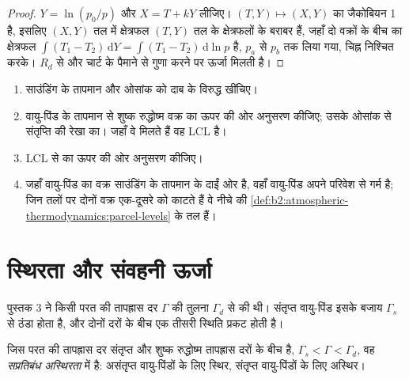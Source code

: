 \begin{proof}
$Y = \ln(p_0/p)$ और $X = T + kY$ लीजिए। $(T, Y) \mapsto (X, Y)$ का जैकोबियन 1 है, इसलिए
$(X, Y)$ तल में क्षेत्रफल $(T, Y)$ तल के क्षेत्रफलों के बराबर हैं, जहाँ दो वक्रों के बीच का क्षेत्रफल
$\int (T_1 - T_2)\,\mathrm{d}Y = \int (T_1 - T_2)\,\mathrm{d}\ln p$ है, $p_a$ से $p_b$ तक लिया गया,
चिह्न निश्चित करके। $R_d$ से और चार्ट के पैमाने से गुणा करने पर ऊर्जा मिलती है।
\end{proof}

\begin{method}[आरेख पर वायु-पिंड को उठाना]\label{met:b2:atmospheric-thermodynamics:lift}
\begin{enumerate}
  \item साउंडिंग के तापमान और ओसांक को दाब के विरुद्ध खींचिए।
  \item वायु-पिंड के तापमान से शुष्क रुद्धोष्म वक्र का ऊपर की ओर अनुसरण कीजिए; उसके ओसांक से
        संतृप्ति  की रेखा का। जहाँ वे मिलते हैं वह LCL है।
  \item LCL से  का ऊपर की ओर अनुसरण कीजिए।
  \item जहाँ वायु-पिंड का वक्र साउंडिंग के तापमान के दाईं ओर है, वहाँ वायु-पिंड
        अपने परिवेश से गर्म है; जिन तलों पर दोनों वक्र एक-दूसरे को काटते हैं वे नीचे की
        \cref{def:b2:atmospheric-thermodynamics:parcel-levels} के तल हैं।
\end{enumerate}
\end{method}


\section{स्थिरता और संवहनी ऊर्जा}\label{sec:b2:atmospheric-thermodynamics:stability}

पुस्तक 3 ने किसी परत की तापह्रास दर $\Gamma$ की तुलना $\Gamma_d$ से की थी। संतृप्त
वायु-पिंड इसके बजाय $\Gamma_s$ से ठंडा होता है, और दोनों दरों के बीच एक तीसरी स्थिति प्रकट होती है।

\begin{definition}[सप्रतिबंध अस्थिरता]\label{def:b2:atmospheric-thermodynamics:instability}
जिस परत की तापह्रास दर संतृप्त और शुष्क रुद्धोष्म तापह्रास दरों के बीच है,
$\Gamma_s < \Gamma < \Gamma_d$, वह \emph{सप्रतिबंध अस्थिरता}
में है: असंतृप्त वायु-पिंडों के लिए स्थिर, संतृप्त वायु-पिंडों के लिए अस्थिर।
\end{definition}

